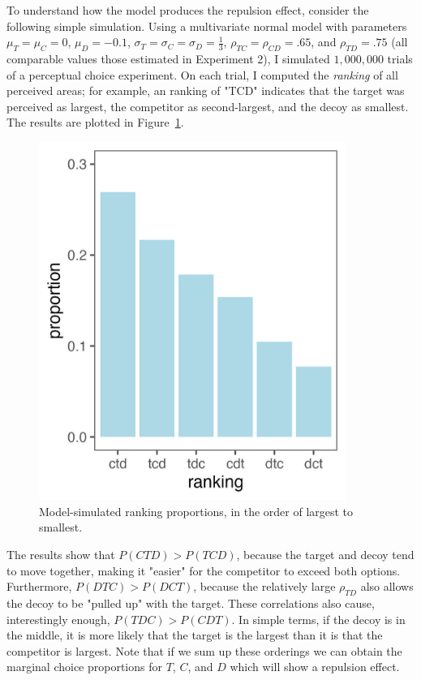 To understand how the model produces the repulsion effect, consider the following simple simulation. Using a multivariate normal model with parameters $\mu_{T}=\mu_{C}=0$, $\mu_{D}=-0.1$, $\sigma_{T}=\sigma_{C}=\sigma_{D}=\frac{1}{3}$, $\rho_{TC}=\rho_{CD}=.65$, and $\rho_{TD}=.75$ (all comparable values those estimated in Experiment 2), I simulated $1,000,000$ trials of a perceptual choice experiment. On each trial, I computed the \textit{ranking} of all perceived areas; for example, an ranking of "TCD" indicates that the target was perceived as largest, the competitor as second-largest, and the decoy as smallest. The results are plotted in Figure~\ref{fig:sim_orderings}. 

\begin{figure}
   \includegraphics[width=100mm]{figures/sim_mvnorm_rank.jpeg}
   \caption{Model-simulated ranking proportions, in the order of largest to smallest.}
   \label{fig:sim_orderings}
\end{figure}

The results show that $P(CTD)>P(TCD)$, because the target and decoy tend to move together, making it "easier" for the competitor to exceed both options. Furthermore, $P(DTC)>P(DCT)$, because the relatively large $\rho_{TD}$ also allows the decoy to be "pulled up" with the target. These correlations also cause, interestingly enough, $P(TDC)>P(CDT)$. In simple terms, if the decoy is in the middle, it is more likely that the target is the largest than it is that the competitor is largest. Note that if we sum up these orderings we can obtain the marginal choice proportions for $T$, $C$, and $D$ which will show a repulsion effect. 

